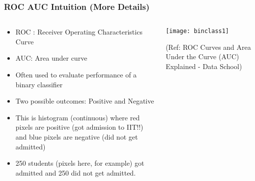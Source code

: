 \begin{frame}[fragile]\frametitle{ROC AUC Intuition (More Details)}

\begin{columns}
\begin{column}[T]{0.5\linewidth}
\begin{itemize}
\item ROC : Receiver Operating Characteristics Curve
\item AUC: Area under curve
\item Often used to evaluate performance of a binary classifier
\item Two possible outcomes: Positive and Negative
\item This is histogram (continuous) where red pixels are positive (got admission to IIT!!) and blue pixels are negative (did not get admitted)
\item 250 students (pixels here, for example) got admitted and 250 did not get admitted.
\end{itemize}
\end{column}
\begin{column}[T]{0.5\linewidth}

\begin{center}
\texttt{[image: binclass1]}
\end{center}

\tiny{(Ref: ROC Curves and Area Under the Curve (AUC) Explained - Data School)}
\end{column}

\end{columns}
\end{frame}

